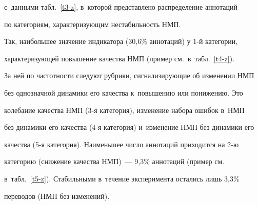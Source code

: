 с~данными табл.~\ref{t3-z}, в~которой представлено распределение аннотаций 


по категориям, ха\-рак\-те\-ри\-зу\-ющим нестабильность НМП.


  


  Так, наибольшее значение индикатора (30,6\% аннотаций) у 1-й категории, 


характеризующей повышение качества НМП (пример см.\ в~табл.~\ref{t4-z}). 


За ней по частотности следуют рубрики, сигнализирующие об изменении НМП 


без однозначной динамики его качества к~повышению или понижению. Это 


колебание качества НМП (3-я категория), изменение набора ошибок в~НМП 


без динамики его качества (4-я категория) и~изменение НМП без динамики его 


качества (5-я категория). Наименьшее число аннотаций приходится на 2-ю 


категорию (снижение качества НМП)~--- 9,3\% аннотаций (пример см.\ 


в~табл.~\ref{t5-z}). Стабильными в~течение эксперимента остались лишь 3,3\% 


переводов (НМП без изменений).


  





